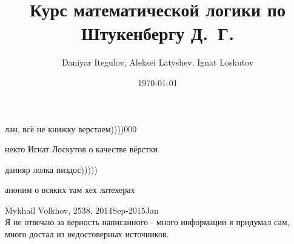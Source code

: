 \documentclass[fleqn,12pt]{article}
\author{Daniyar Itegulov, Aleksei Latyshev, Ignat Loskutov}
\date{\today}
\title{Курс математической логики по Штукенбергу Д.~Г.}
\newcommand{\+}{\lambda}
\begin{document}
\theoremstyle{definition}
\newtheorem*{definition}{Определение}%
\newtheorem*{example}{Пример}
\newtheorem{theorem}{Теорема}[section]
\newtheorem{axiom}{Аксиома}[section]
\newtheorem{lemma}[theorem]{Лемма}

\maketitle
\tableofcontents

\epigraph{%
    лан, всё не книжку верстаем))))000}
  {некто Игнат Лоскутов о качестве вёрстки}  
\epigraph{%
    данияр лолка пиздос)))))}
  {аноним о всяких там хех латехерах}

Mykhail Volkhov, 2538, 2014Sep-2015Jan\\
Я не отвечаю за верность написанного - много информации
я придумал сам, много достал из недостоверных источников.










\end{document}
